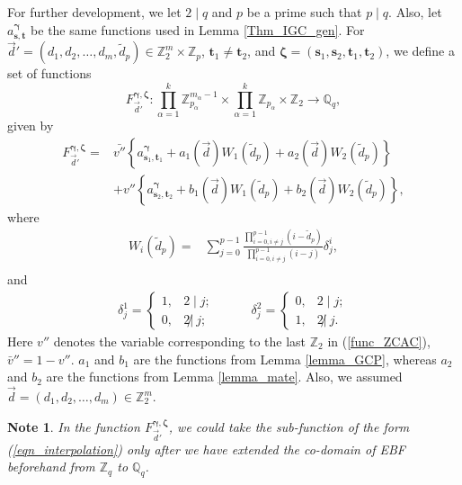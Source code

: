 \documentclass[pdflatex,sn-mathphys-num]{sn-jnl}%
\theoremstyle{thmstyleone}
\newtheorem{note}{Note}
\begin{document}
	For further development, we let $2 \mid q$ and $p$ be a prime such that  $p \mid q$. Also, let $a_{\mathbf{s}, \mathbf{t}}^{\bm{\gamma}}$ be the same functions used in Lemma \ref{Thm_IGC_gen}. For $\vec{d}'=(d_1, d_2, \dots, d_m, \tilde{d}_{p}) \in \mathbb{Z}_2^{m} \times \mathbb{Z}_{p}$, $\mathbf{t}_1 \neq \mathbf{t}_2$, and $\bm{\zeta}=(\mathbf{s}_1, \mathbf{s}_2, \mathbf{t}_1, \mathbf{t}_2)$, we define a set of functions
	\begin{equation}\label{func_ZCAC}
		F_{\vec{d}'}^{\bm{\gamma}, \bm{\zeta}}: \prod_{\alpha=1}^{k} \mathbb{Z}_{p_\alpha}^{m_\alpha-1} \times \prod_{\alpha=1}^{k} \mathbb{Z}_{p_\alpha} \times \mathbb{Z}_2 \rightarrow \mathbb{Q}_q,
	\end{equation}
	given by
	\begin{equation}\label{func_ZCAC_def}
		\begin{split}
			F_{ \vec{d}'}^{\bm{\gamma}, \bm{\zeta}} = &\bar{v''} \left\{a_{\mathbf{s}_1,\mathbf{t}_1}^{\bm{\gamma}} + a_1(\vec{d}) W_1 (\tilde{d}_p) + a_2( \vec{d}) W_2 (\tilde{d}_p)  \right\} \\
			&+ v'' \left\{a_{\mathbf{s}_2,\mathbf{t}_2}^{\bm{\gamma}} + b_1(\vec{d}) W _1(\tilde{d}_p) + b_2(\vec{d}) W _2(\tilde{d}_p) \right\},
		\end{split}
	\end{equation}
	where
	\begin{equation}\label{eqn_interpolation}
		\begin{split}
			W_i(\tilde{d}_p)= &\sum_{j=0}^{p-1} \frac{\prod_{i=0, i\neq j}^{p-1} (i-\tilde{d}_p)}{ \prod_{i=0, i \neq j}^{p-1} (i-j)} \delta^i_j,\\
		\end{split} 
	\end{equation}
	and
	\begin{equation}
		\begin{split}
			\delta^1_j= 
			\begin{cases}
				1 , & 2 \mid j;\\
				0, & 2 \not|~ j;
			\end{cases}& \qquad
			\delta^2_j=
			\begin{cases}
				0, & 2 \mid j;\\
				1, & 2 \not|~ j.
			\end{cases}
		\end{split}
	\end{equation} 
	Here $v''$ denotes the variable corresponding to the last $\mathbb{Z}_2$ in (\ref{func_ZCAC}), $\bar{v}'' = 1-v''$. $a_1$ and $b_1$ are the functions from Lemma \ref{lemma_GCP}, whereas  $a_2$ and $b_2$ are the functions from Lemma \ref{lemma_mate}. Also, we assumed $\vec{d}= (d_1,d_2, \dots, d_m) \in \mathbb{Z}_2^m$.
	\begin{note}
		In the function $F_{\vec{d}'}^{\bm{\gamma}, \bm{\zeta}}$, we could take the sub-function of the form (\ref{eqn_interpolation}) only after we have extended the co-domain of EBF beforehand from $\mathbb{Z}_q$ to $\mathbb{Q}_q$.
	\end{note}
	
\end{document}
